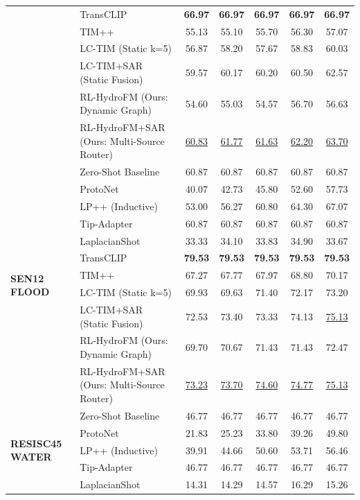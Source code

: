 \begin{table}[t]
{\begin{tabular}{llccccc}
 & TransCLIP & \textbf{66.97} & \textbf{66.97} & \textbf{66.97} & \textbf{66.97} & \textbf{66.97} \\
 & TIM++ & 55.13 & 55.10 & 55.70 & 56.30 & 57.07 \\
 & LC-TIM (Static k=5) & 56.87 & 58.20 & 57.67 & 58.83 & 60.03 \\
 & LC-TIM+SAR (Static Fusion) & 59.57 & 60.17 & 60.20 & 60.50 & 62.57 \\
 & RL-HydroFM (Ours: Dynamic Graph) & 54.60 & 55.03 & 54.57 & 56.70 & 56.63 \\
 & RL-HydroFM+SAR (Ours: Multi-Source Router) & \underline{60.83} & \underline{61.77} & \underline{61.63} & \underline{62.20} & \underline{63.70} \\
\midrule
\multirow{11}{*}{\textbf{SEN12 FLOOD}}
 & Zero-Shot Baseline & 60.87 & 60.87 & 60.87 & 60.87 & 60.87 \\
 & ProtoNet & 40.07 & 42.73 & 45.80 & 52.60 & 57.73 \\
 & LP++ (Inductive) & 53.00 & 56.27 & 60.80 & 64.30 & 67.07 \\
 & Tip-Adapter & 60.87 & 60.87 & 60.87 & 60.87 & 60.87 \\
 & LaplacianShot & 33.33 & 34.10 & 33.83 & 34.90 & 33.67 \\
 & TransCLIP & \textbf{79.53} & \textbf{79.53} & \textbf{79.53} & \textbf{79.53} & \textbf{79.53} \\
 & TIM++ & 67.27 & 67.77 & 67.97 & 68.80 & 70.17 \\
 & LC-TIM (Static k=5) & 69.93 & 69.63 & 71.40 & 72.17 & 73.20 \\
 & LC-TIM+SAR (Static Fusion) & 72.53 & 73.40 & 73.33 & 74.13 & \underline{75.13} \\
 & RL-HydroFM (Ours: Dynamic Graph) & 69.70 & 70.67 & 71.43 & 71.43 & 72.47 \\
 & RL-HydroFM+SAR (Ours: Multi-Source Router) & \underline{73.23} & \underline{73.70} & \underline{74.60} & \underline{74.77} & \underline{75.13} \\
\midrule
\multirow{11}{*}{\textbf{RESISC45 WATER}}
 & Zero-Shot Baseline & 46.77 & 46.77 & 46.77 & 46.77 & 46.77 \\
 & ProtoNet & 21.83 & 25.23 & 33.80 & 39.26 & 49.80 \\
 & LP++ (Inductive) & 39.91 & 44.66 & 50.60 & 53.71 & 56.46 \\
 & Tip-Adapter & 46.77 & 46.77 & 46.77 & 46.77 & 46.77 \\
 & LaplacianShot & 14.31 & 14.29 & 14.57 & 16.29 & 15.26 \\

\end{tabular}}
\end{table}
